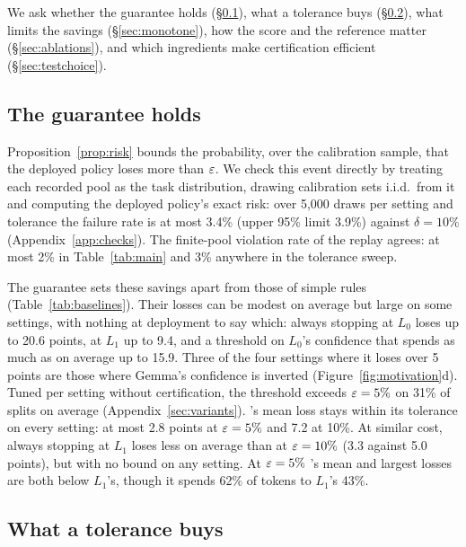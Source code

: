 

We ask whether the guarantee holds (\S\ref{sec:main}), what a tolerance buys (\S\ref{sec:tradeoff}), what
limits the savings (\S\ref{sec:monotone}), how the score and the reference matter (\S\ref{sec:ablations}), and which ingredients make certification efficient
(\S\ref{sec:testchoice}).

\subsection{The guarantee holds}
\label{sec:main}

Proposition~\ref{prop:risk} bounds the probability, over the calibration sample, that the deployed
policy loses more than $\varepsilon$. We check this event directly by treating each recorded pool as the
task distribution, drawing calibration sets i.i.d.\ from it and computing the deployed policy's
exact risk: over 5{,}000 draws per setting and tolerance the failure rate is at most 3.4\% (upper
95\% limit 3.9\%) against $\delta = 10\%$ (Appendix~\ref{app:checks}). The finite-pool violation rate
of the replay agrees: at most 2\% in Table~\ref{tab:main} and 3\% anywhere in the tolerance sweep.



The guarantee sets these savings apart from those of simple rules (Table~\ref{tab:baselines}).
Their losses can be modest on average but large on some settings, with nothing at deployment to say
which: always stopping at $L_0$ loses up to 20.6 points, at $L_1$ up to 9.4, and a
threshold on $L_0$'s confidence that spends as much as \climb{} on average up to 15.9. Three of the four settings where
it loses over 5 points are those where Gemma's confidence is inverted (Figure~\ref{fig:motivation}d). Tuned per setting without certification, the threshold
exceeds $\varepsilon = 5\%$ on 31\% of splits on average (Appendix~\ref{sec:variants}). \climb{}'s
mean loss stays within its tolerance on every setting: at most 2.8 points at $\varepsilon = 5\%$ and 7.2 at 10\%. At similar cost,
always stopping at $L_1$ loses less on average than \climb{} at $\varepsilon = 10\%$ (3.3 against 5.0 points),
but with no bound on any setting. At $\varepsilon = 5\%$ \climb{}'s mean and largest losses are both
below $L_1$'s, though it spends 62\% of tokens to $L_1$'s 43\%.

\subsection{What a tolerance buys}
\label{sec:tradeoff}

